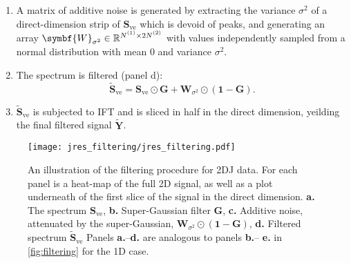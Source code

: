 \begin{enumerate}
    \item A matrix of additive noise is generated by extracting the variance
        $\sigma^2$ of a direct-dimension strip of $\symbf{S}_{\text{ve}}$ which
        is devoid of peaks, and generating an array $\symbf{W}_{\sigma^2} \in
        \mathbb{R}^{\None \times 2 \Ntwo}$ with values independently sampled
        from a normal distribution with mean $0$ and variance  $\sigma^2$.
    \item The spectrum is filtered (panel d):
        \begin{equation}
            \widetilde{\symbf{S}}_{\text{ve}} = \symbf{S}_{\text{ve}} \odot
            \symbf{G} + \symbf{W}_{\sigma^2} \odot (\symbf{1} - \symbf{G}).
        \end{equation}
    \item $\widetilde{\symbf{S}}_{\text{ve}}$ is subjected to \ac{IFT} and is
        sliced in half in the direct dimension, yeilding the final filtered
        signal $\widetilde{\symbf{Y}}$.
\end{enumerate}

\begin{figure}
    \centering
    \texttt{[image: jres\_filtering/jres\_filtering.pdf]}
    \caption[
        An illustration of the filtering procedure for \ac{2DJ} data.
    ]
    {
        An illustration of the filtering procedure for \ac{2DJ} data.
        For each panel is a heat-map of the full \ac{2D} signal, as well as a
        plot underneath of the first slice of the signal in the direct
        dimension.
        \textbf{a.} The spectrum $\symbf{S}_{\text{ve}}$,
        \textbf{b.} Super-Gaussian filter $\symbf{G}$,
        \textbf{c.} Additive noise, attenuated by the super-Gaussian, $\symbf{W}_{\sigma^2} \odot (\symbf{1} - \symbf{G})$,
        \textbf{d.} Filtered spectrum $\widetilde{\symbf{S}}_{\text{ve}}$
        Panels \textbf{a.}--\textbf{d.} are analogous to panels \textbf{b.}--
        \textbf{e.} in \cref{fig:filtering} for the \ac{1D} case.
    }
    \label{fig:jres-filtering}
\end{figure}


